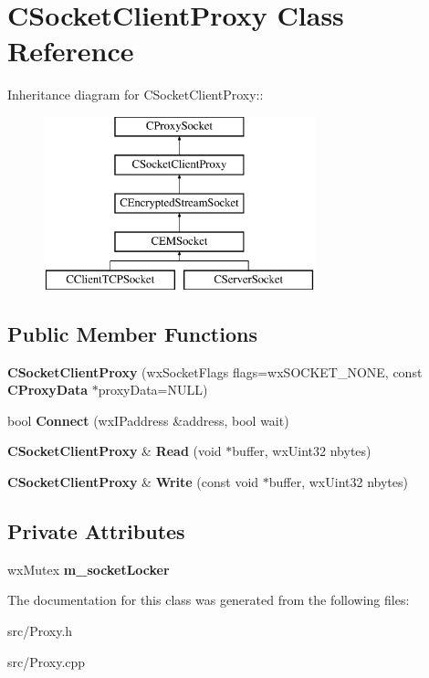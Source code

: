\section{CSocketClientProxy Class Reference}
\label{classCSocketClientProxy}
Inheritance diagram for CSocketClientProxy::\begin{figure}[H]
\begin{center}
\leavevmode
\includegraphics[height=5cm]{classCSocketClientProxy}
\end{center}
\end{figure}
\subsection*{Public Member Functions}
\begin{DoxyCompactItemize}
\item 
{\bfseries CSocketClientProxy} (wxSocketFlags flags=wxSOCKET\_\-NONE, const {\bf CProxyData} $\ast$proxyData=NULL)\label{classCSocketClientProxy_ad69a066a9612ed325f99848dcc7627be}

\item 
bool {\bfseries Connect} (wxIPaddress \&address, bool wait)\label{classCSocketClientProxy_aaecbbb817faac58b712470e662f81c41}

\item 
{\bf CSocketClientProxy} \& {\bfseries Read} (void $\ast$buffer, wxUint32 nbytes)\label{classCSocketClientProxy_a276142cd14c4dffda9a353f831e1bd4f}

\item 
{\bf CSocketClientProxy} \& {\bfseries Write} (const void $\ast$buffer, wxUint32 nbytes)\label{classCSocketClientProxy_a101abf166689b2931f171deb94931c25}

\end{DoxyCompactItemize}
\subsection*{Private Attributes}
\begin{DoxyCompactItemize}
\item 
wxMutex {\bfseries m\_\-socketLocker}\label{classCSocketClientProxy_aedbb0cf0f706971c12a6519d9969f250}

\end{DoxyCompactItemize}


The documentation for this class was generated from the following files:\begin{DoxyCompactItemize}
\item 
src/Proxy.h\item 
src/Proxy.cpp\end{DoxyCompactItemize}
